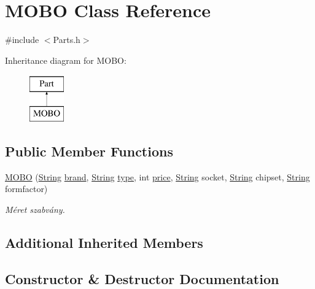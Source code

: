 \hypertarget{class_m_o_b_o}{}\section{M\+O\+BO Class Reference}
\label{class_m_o_b_o}


{\ttfamily \#include $<$Parts.\+h$>$}

Inheritance diagram for M\+O\+BO\+:\begin{figure}[H]
\begin{center}
\leavevmode
\includegraphics[height=2.000000cm]{class_m_o_b_o}
\end{center}
\end{figure}
\subsection*{Public Member Functions}
\begin{DoxyCompactItemize}
\item 
\mbox{\hyperlink{class_m_o_b_o_a3185de871765391ae3a0ffe4b0af7e5b}{M\+O\+BO}} (\mbox{\hyperlink{class_string}{String}} \mbox{\hyperlink{class_part_ae06f2fdeb7fbbdb229a7aca151f3e341}{brand}}, \mbox{\hyperlink{class_string}{String}} \mbox{\hyperlink{class_part_a101dbcc5c4b21564df7414c7eb0eae88}{type}}, int \mbox{\hyperlink{class_part_a8e71223aed1da95a974f33d8d6c91bb1}{price}}, \mbox{\hyperlink{class_string}{String}} socket, \mbox{\hyperlink{class_string}{String}} chipset, \mbox{\hyperlink{class_string}{String}} formfactor)
\begin{DoxyCompactList}\small\item\em Méret szabvány. \end{DoxyCompactList}\end{DoxyCompactItemize}
\subsection*{Additional Inherited Members}


\subsection{Constructor \& Destructor Documentation}
\mbox{\label{class_m_o_b_o_a3185de871765391ae3a0ffe4b0af7e5b}} 
